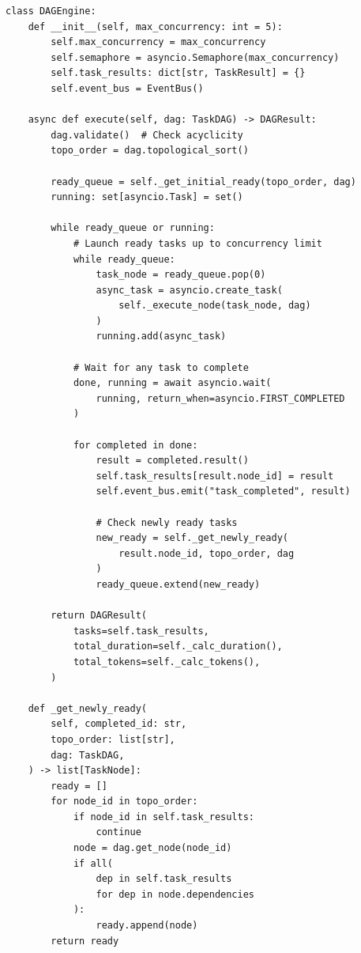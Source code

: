 \documentclass[12pt,a4paper]{ctexrep}
\begin{document}
\begin{lstlisting}[language=Python3,caption=DAG编排引擎核心实现,label=lst:dag-engine]
class DAGEngine:
    def __init__(self, max_concurrency: int = 5):
        self.max_concurrency = max_concurrency
        self.semaphore = asyncio.Semaphore(max_concurrency)
        self.task_results: dict[str, TaskResult] = {}
        self.event_bus = EventBus()

    async def execute(self, dag: TaskDAG) -> DAGResult:
        dag.validate()  # Check acyclicity
        topo_order = dag.topological_sort()

        ready_queue = self._get_initial_ready(topo_order, dag)
        running: set[asyncio.Task] = set()

        while ready_queue or running:
            # Launch ready tasks up to concurrency limit
            while ready_queue:
                task_node = ready_queue.pop(0)
                async_task = asyncio.create_task(
                    self._execute_node(task_node, dag)
                )
                running.add(async_task)

            # Wait for any task to complete
            done, running = await asyncio.wait(
                running, return_when=asyncio.FIRST_COMPLETED
            )

            for completed in done:
                result = completed.result()
                self.task_results[result.node_id] = result
                self.event_bus.emit("task_completed", result)

                # Check newly ready tasks
                new_ready = self._get_newly_ready(
                    result.node_id, topo_order, dag
                )
                ready_queue.extend(new_ready)

        return DAGResult(
            tasks=self.task_results,
            total_duration=self._calc_duration(),
            total_tokens=self._calc_tokens(),
        )

    def _get_newly_ready(
        self, completed_id: str,
        topo_order: list[str],
        dag: TaskDAG,
    ) -> list[TaskNode]:
        ready = []
        for node_id in topo_order:
            if node_id in self.task_results:
                continue
            node = dag.get_node(node_id)
            if all(
                dep in self.task_results
                for dep in node.dependencies
            ):
                ready.append(node)
        return ready
\end{lstlisting}
\end{document}
